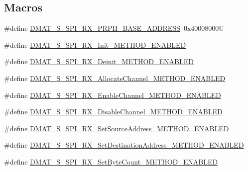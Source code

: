 \subsection*{Macros}
\begin{DoxyCompactItemize}
\item 
\#define \hyperlink{group___d_m_a_t___s___s_p_i___r_x__module_gac46ff46bab67e024f6e6aecd26e19dcb}{D\-M\-A\-T\-\_\-\-S\-\_\-\-S\-P\-I\-\_\-\-R\-X\-\_\-\-P\-R\-P\-H\-\_\-\-B\-A\-S\-E\-\_\-\-A\-D\-D\-R\-E\-S\-S}~0x40008000\-U
\item 
\#define \hyperlink{group___d_m_a_t___s___s_p_i___r_x__module_ga54ae86c2ff261a0521a5ba6856e466eb}{D\-M\-A\-T\-\_\-\-S\-\_\-\-S\-P\-I\-\_\-\-R\-X\-\_\-\-Init\-\_\-\-M\-E\-T\-H\-O\-D\-\_\-\-E\-N\-A\-B\-L\-E\-D}
\item 
\#define \hyperlink{group___d_m_a_t___s___s_p_i___r_x__module_gab48b4e11a252eb8281daead490231cc8}{D\-M\-A\-T\-\_\-\-S\-\_\-\-S\-P\-I\-\_\-\-R\-X\-\_\-\-Deinit\-\_\-\-M\-E\-T\-H\-O\-D\-\_\-\-E\-N\-A\-B\-L\-E\-D}
\item 
\#define \hyperlink{group___d_m_a_t___s___s_p_i___r_x__module_ga43d9bf728ed9b9c78ec6d563eed05b64}{D\-M\-A\-T\-\_\-\-S\-\_\-\-S\-P\-I\-\_\-\-R\-X\-\_\-\-Allocate\-Channel\-\_\-\-M\-E\-T\-H\-O\-D\-\_\-\-E\-N\-A\-B\-L\-E\-D}
\item 
\#define \hyperlink{group___d_m_a_t___s___s_p_i___r_x__module_ga7655eb910333cbe31d0c934800c9ea94}{D\-M\-A\-T\-\_\-\-S\-\_\-\-S\-P\-I\-\_\-\-R\-X\-\_\-\-Enable\-Channel\-\_\-\-M\-E\-T\-H\-O\-D\-\_\-\-E\-N\-A\-B\-L\-E\-D}
\item 
\#define \hyperlink{group___d_m_a_t___s___s_p_i___r_x__module_ga051573fbacac99df668ae81ba2940bea}{D\-M\-A\-T\-\_\-\-S\-\_\-\-S\-P\-I\-\_\-\-R\-X\-\_\-\-Disable\-Channel\-\_\-\-M\-E\-T\-H\-O\-D\-\_\-\-E\-N\-A\-B\-L\-E\-D}
\item 
\#define \hyperlink{group___d_m_a_t___s___s_p_i___r_x__module_ga457e8a956ecf5b9e7a367642a896cf8c}{D\-M\-A\-T\-\_\-\-S\-\_\-\-S\-P\-I\-\_\-\-R\-X\-\_\-\-Set\-Source\-Address\-\_\-\-M\-E\-T\-H\-O\-D\-\_\-\-E\-N\-A\-B\-L\-E\-D}
\item 
\#define \hyperlink{group___d_m_a_t___s___s_p_i___r_x__module_gabc1776d50917f3d08dd4938ae94604fc}{D\-M\-A\-T\-\_\-\-S\-\_\-\-S\-P\-I\-\_\-\-R\-X\-\_\-\-Set\-Destination\-Address\-\_\-\-M\-E\-T\-H\-O\-D\-\_\-\-E\-N\-A\-B\-L\-E\-D}
\item 
\#define \hyperlink{group___d_m_a_t___s___s_p_i___r_x__module_ga8432f442dbee17163944cb7e2a3cf196}{D\-M\-A\-T\-\_\-\-S\-\_\-\-S\-P\-I\-\_\-\-R\-X\-\_\-\-Set\-Byte\-Count\-\_\-\-M\-E\-T\-H\-O\-D\-\_\-\-E\-N\-A\-B\-L\-E\-D}

\end{DoxyCompactItemize}
